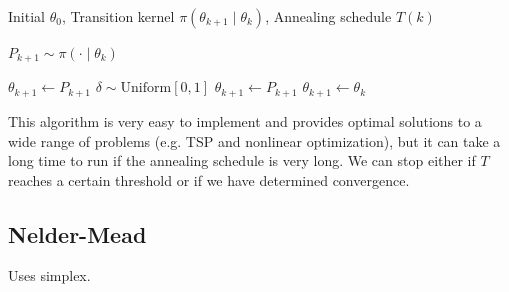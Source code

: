  \begin{algorithm}
  \caption{Simulated Annealing}\label{alg:sim_anneal}
  \begin{algorithmic}

  \Require Initial $\theta_0$, Transition kernel $\pi(\theta_{k+1} \mid \theta_k)$, Annealing schedule $T(k)$

      \State $P_{k+1} \sim \pi( \cdot \mid \theta_k)$
      
          \State $\theta_{k+1} \gets P_{k+1}$ 
      \Else 
          \State $\delta \sim \mathrm{Uniform}[0, 1]$
          \If{$\delta < \exp[(f(P_{k+1}) - f(\theta_k))/T(k)]$}
              \State $\theta_{k+1} \gets P_{k+1}$ 
          \Else 
              \State $\theta_{k+1} \gets \theta_k$ 
          \EndIf
      \EndIf
  \EndFor

  \end{algorithmic}
  \end{algorithm}

  This algorithm is very easy to implement and provides optimal solutions to a wide range of problems (e.g. TSP and nonlinear optimization), but it can take a long time to run if the annealing schedule is very long. We can stop either if $T$ reaches a certain threshold or if we have determined convergence. 

\subsection{Nelder-Mead} 

  Uses simplex. 
